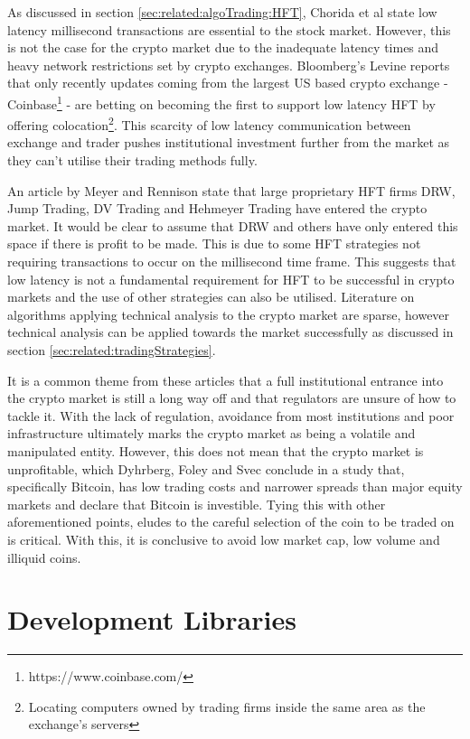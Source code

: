 As discussed in section \ref{sec:related:algoTrading:HFT}, Chorida et al \cite{REPORT:ChordiaEtAl:2013} state low latency millisecond transactions are essential to the stock market. However, this is not the case for the crypto market due to the inadequate latency times and heavy network restrictions set by crypto exchanges. Bloomberg's Levine reports \cite{WEB:Levine:2018} that only recently updates coming from the largest US based crypto exchange - Coinbase\footnote{https://www.coinbase.com/} - are betting on becoming the first to support low latency HFT by offering colocation\footnote{Locating computers owned by trading firms inside the same area as the exchange's servers}. This scarcity of low latency communication between exchange and trader pushes institutional investment further from the market as they can't utilise their trading methods fully.

An article by Meyer and Rennison \cite{ART:Meyer:2017} state that large proprietary HFT firms DRW, Jump Trading, DV Trading and Hehmeyer Trading have entered the crypto market. It would be clear to assume that DRW and others have only entered this space if there is profit to be made. This is due to some HFT strategies not requiring transactions to occur on the millisecond time frame. This suggests that low latency is not a fundamental requirement for HFT to be successful in crypto markets and the use of other strategies can also be utilised. Literature on algorithms applying technical analysis to the crypto market are sparse, however technical analysis can be applied towards the market successfully as discussed in section \ref{sec:related:tradingStrategies}.


It is a common theme from these articles that a full institutional entrance into the crypto market is still a long way off and that regulators are unsure of how to tackle it. With the lack of regulation, avoidance from most institutions and poor infrastructure ultimately marks the crypto market as being a volatile and manipulated entity. However, this does not mean that the crypto market is unprofitable, which Dyhrberg, Foley and Svec \cite{ART:Dyhrberg:2018} conclude in a study that, specifically Bitcoin, has low trading costs and narrower spreads than major equity markets and declare that Bitcoin is investible. Tying this with other aforementioned points, eludes to the careful selection of the coin to be traded on is critical. With this, it is conclusive to avoid low market cap, low volume and illiquid coins. 


\newpage
\section{Development Libraries}
\label{sec:related:developmentLibraries}

